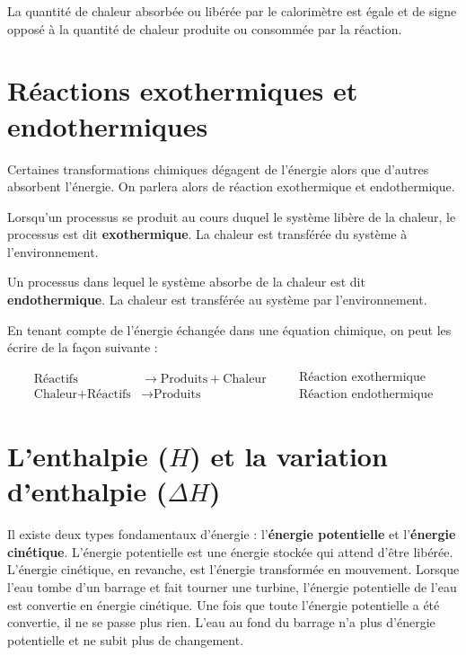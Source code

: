 \documentclass[
  11pt,
  a4paper,
  openany]{book}
\begin{document}
La quantité de chaleur absorbée ou libérée par le calorimètre est égale et de signe opposé à la quantité de chaleur produite ou consommée par la réaction.

\clearpage

\hypertarget{ruxe9actions-exothermiques-et-endothermiques}{%
\section{Réactions exothermiques et endothermiques}\label{ruxe9actions-exothermiques-et-endothermiques}}

Certaines transformations chimiques dégagent de l'énergie alors que d'autres absorbent l'énergie. On parlera alors de réaction exothermique et endothermique.

Lorsqu'un processus se produit au cours duquel le système libère de la chaleur, le processus est dit \textbf{exothermique}. La chaleur est transférée du système à l'environnement.

Un processus dans lequel le système absorbe de la chaleur est dit \textbf{endothermique}. La chaleur est transférée au système par l'environnement.

En tenant compte de l'énergie échangée dans une équation chimique, on peut les écrire de la façon suivante :

\[
\begin{split}
  \text{Réactifs} & \rightarrow \text{Produits} + \text{Chaleur} \\
  \text{Chaleur} + \text{Réactifs} & \rightarrow \text{Produits}
\end{split}
\quad
\begin{split}
  &\text{Réaction exothermique} \\
  &\text{Réaction endothermique}
\end{split}
\]

\hypertarget{lenthalpie-h-et-la-variation-denthalpie-delta-h}{%
\section{\texorpdfstring{L'enthalpie (\(H\)) et la variation d'enthalpie (\(\Delta H\))}{L'enthalpie (H) et la variation d'enthalpie (\textbackslash Delta H)}}\label{lenthalpie-h-et-la-variation-denthalpie-delta-h}}

Il existe deux types fondamentaux d'énergie : l'\textbf{énergie potentielle} et l'\textbf{énergie cinétique}. L'énergie potentielle est une énergie stockée qui attend d'être libérée. L'énergie cinétique, en revanche, est l'énergie transformée en mouvement. Lorsque l'eau tombe d'un barrage et fait tourner une turbine, l'énergie potentielle de l'eau est convertie en énergie cinétique. Une fois que toute l'énergie potentielle a été convertie, il ne se passe plus rien. L'eau au fond du barrage n'a plus d'énergie potentielle et ne subit plus de changement.
\end{document}
